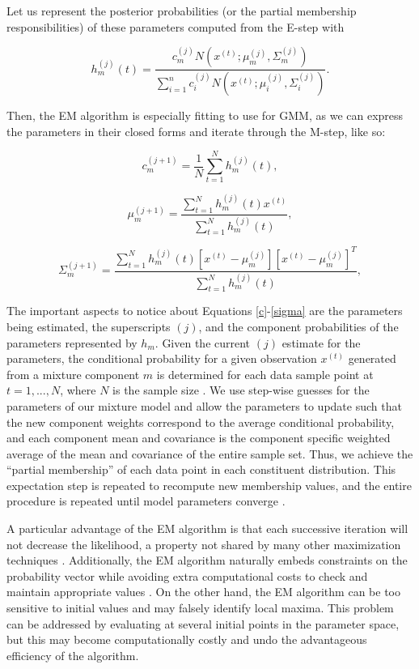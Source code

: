\documentclass[12pt]{article}
\begin{document}
Let us represent the posterior probabilities (or the partial membership
responsibilities) of these parameters computed from the E-step with

\begin{equation}
\label{posterior}
h_m^{(j)}(t) = \frac{c_m^{(j)} N(x^{(t)}; \mu_m^{(j)}, \Sigma_m^{(j)})}{\sum_{i=1}^n c_i^{(j)} N(x^{(t)}; \mu_i^{(j)}, \Sigma_i^{(j)})}.
\end{equation}

Then, the EM algorithm is especially fitting to use for GMM, as we can
express the parameters in their closed forms and iterate through the
M-step, like so:

\begin{equation}
\label{c}
c_m^{(j+1)} = \frac{1}{N} \sum_{t=1}^N h_m^{(j)}(t),
\end{equation}

\begin{equation}
\label{mu}
\mu_m^{(j+1)} = \frac{\sum_{t=1}^N h_m^{(j)}(t) x^{(t)}}{\sum_{t=1}^N h_m^{(j)}(t)},
\end{equation}

\begin{equation}
\label{sigma}
\Sigma_m^{(j+1)} = \frac{\sum_{t=1}^N h_m^{(j)}(t) [x^{(t)} - \mu_m^{(j)}][x^{(t)} - \mu_m^{(j)}]^T}{\sum_{t=1}^N h_m^{(j)}(t)},
\end{equation}

The important aspects to notice about Equations \ref{c}-\ref{sigma} are
the parameters being estimated, the superscripts \((j)\), and the
component probabilities of the parameters represented by \(h_m\). Given
the current \((j)\) estimate for the parameters, the conditional
probability for a given observation \(x^{(t)}\) generated from a mixture
component \(m\) is determined for each data sample point at
\(t=1, ..., N\), where \(N\) is the sample size
\citep{do2008expectation}. We use step-wise guesses for the parameters
of our mixture model and allow the parameters to update such that the
new component weights correspond to the average conditional probability,
and each component mean and covariance is the component specific
weighted average of the mean and covariance of the entire sample set.
Thus, we achieve the ``partial membership'' of each data point in each
constituent distribution. This expectation step is repeated to recompute
new membership values, and the entire procedure is repeated until model
parameters converge \citep{bouguila2020mixture}.

A particular advantage of the EM algorithm is that each successive
iteration will not decrease the likelihood, a property not shared by
many other maximization techniques \citep{reynolds2009gaussian}.
Additionally, the EM algorithm naturally embeds constraints on the
probability vector while avoiding extra computational costs to check and
maintain appropriate values \citep{yu2015gaussian}. On the other hand,
the EM algorithm can be too sensitive to initial values and may falsely
identify local maxima. This problem can be addressed by evaluating at
several initial points in the parameter space, but this may become
computationally costly and undo the advantageous efficiency of the
algorithm.
\end{document}
